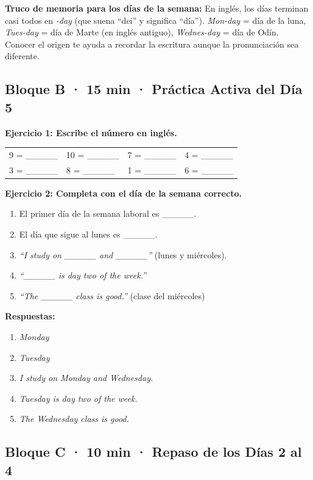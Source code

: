 \noindent
\textbf{Truco de memoria para los días de la semana:}
En inglés, los días terminan casi todos en \textit{-day}
(que suena ``dei'' y significa ``día'').
\textit{Mon-day} = día de la luna, \textit{Tues-day} = día de
Marte (en inglés antiguo), \textit{Wednes-day} = día de Odín.
Conocer el origen te ayuda a recordar la escritura aunque la
pronunciación sea diferente.

\subsection*{Bloque B · 15 min · Práctica Activa del Día 5}

\noindent
\textbf{Ejercicio 1: Escribe el número en inglés.}

\medskip
\begin{tabular}{@{}llll@{}}
  9  = \_\_\_\_\_ &
  10 = \_\_\_\_\_ &
  7  = \_\_\_\_\_ &
  4  = \_\_\_\_\_ \\[4pt]
  3  = \_\_\_\_\_ &
  8  = \_\_\_\_\_ &
  1  = \_\_\_\_\_ &
  6  = \_\_\_\_\_ \\
\end{tabular}

\bigskip
\noindent
\textbf{Ejercicio 2: Completa con el día de la semana correcto.}

\begin{enumerate}
  \item El primer día de la semana laboral es \_\_\_\_\_.
  \item El día que sigue al lunes es \_\_\_\_\_.
  \item \textit{``I study on \_\_\_\_\_ and \_\_\_\_\_''}
        (lunes y miércoles).
  \item \textit{``\_\_\_\_\_ is day two of the week.''}
  \item \textit{``The \_\_\_\_\_ class is good.''}
        (clase del miércoles)
\end{enumerate}

\medskip
\noindent
\textbf{Respuestas:}
\begin{enumerate}
  \item \textit{Monday}
  \item \textit{Tuesday}
  \item \textit{I study on Monday and Wednesday.}
  \item \textit{Tuesday is day two of the week.}
  \item \textit{The Wednesday class is good.}
\end{enumerate}

\subsection*{Bloque C · 10 min · Repaso de los Días 2 al 4}

